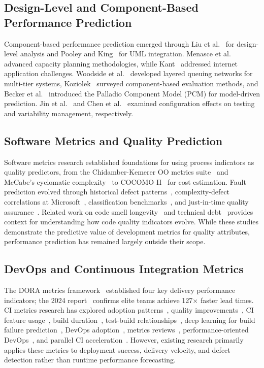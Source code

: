 \documentclass[technologies,article,submit,pdftex,moreauthors]{Definitions/mdpi}
\begin{document}
\subsection{Design-Level and Component-Based Performance
Prediction}\label{sec:rw_component}

Component-based performance prediction emerged through Liu et
al.~\cite{liu2005} for design-level analysis and Pooley and
King~\cite{pooley1999} for UML integration. Menasce et
al.~\cite{menasce2004} advanced capacity planning methodologies, while
Kant~\cite{kant1992} addressed internet application challenges.
Woodside et al.~\cite{woodside2007} developed layered queuing networks
for multi-tier systems, Koziolek~\cite{koziolek2010} surveyed
component-based evaluation methods, and Becker et al.~\cite{becker2009}
introduced the Palladio Component Model (PCM) for model-driven
prediction. Jin et al.~\cite{jin2014} and Chen et al.~\cite{chen2009}
examined configuration effects on testing and variability management,
respectively.

\subsection{Software Metrics and Quality
Prediction}\label{sec:rw_metrics}

Software metrics research established foundations for using process
indicators as quality predictors, from the Chidamber-Kemerer OO metrics
suite~\cite{chidamber1994} and McCabe's cyclomatic
complexity~\cite{mccabe1976} to COCOMO II~\cite{boehm2000} for cost
estimation. Fault prediction evolved through historical defect
patterns~\cite{ostrand2002}, complexity-defect correlations at
Microsoft~\cite{nagappan2006}, classification
benchmarks~\cite{lessmann2008}, and just-in-time quality
assurance~\cite{kamei2013}. Related work on code smell
longevity~\cite{arcoverde2011} and technical debt~\cite{li2015}
provides context for understanding how code quality indicators evolve.
While these studies demonstrate the predictive value of development
metrics for quality attributes, performance prediction has remained
largely outside their scope.

\subsection{DevOps and Continuous Integration
Metrics}\label{sec:rw_devops}

The DORA metrics framework~\cite{forsgren2018} established four key
delivery performance indicators; the 2024 report~\cite{dora2024}
confirms elite teams achieve 127\(\times\) faster lead times. CI metrics
research has explored adoption patterns~\cite{hilton2016}, quality
improvements~\cite{vasilescu2015}, CI feature
usage~\cite{gallaba2020}, build duration~\cite{ghaleb2019}, test-build
relationships~\cite{beller2017}, deep learning for build failure
prediction~\cite{saidani2022}, DevOps adoption~\cite{riungu2016},
metrics reviews~\cite{devopsmetrics2024}, performance-oriented
DevOps~\cite{brunnert2015}, and parallel CI
acceleration~\cite{parallelci2023}. However, existing research
primarily applies these metrics to deployment success, delivery
velocity, and defect detection rather than runtime performance
forecasting.
\end{document}
